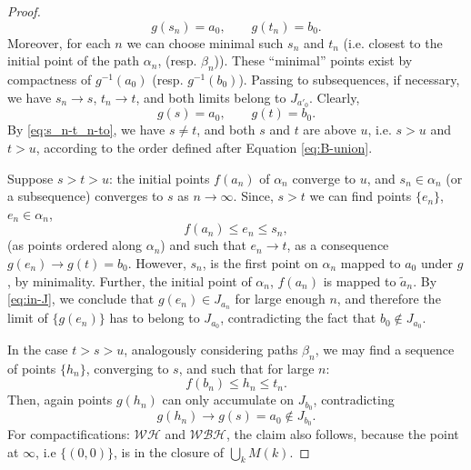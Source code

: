 \documentclass[reqno,12pt]{amsart}
\theoremstyle{ourremark}
\numberwithin{equation}{section}
\numberwithin{theorem}{section}
\begin{document}
\begin{proof}
\begin{equation}\label{eq:s_n-t_n-to}
g(s_n)=a_0,\qquad g(t_n)=b_0.
\end{equation}
Moreover, for each $n$ we can choose minimal such $s_n$ and $t_n$ (i.e. closest to the initial point of the path $\alpha_n$, (resp. $\beta_n$)). 
These ``minimal'' points exist by compactness of $g^{-1}(a_0)$ (resp. $g^{-1}(b_0)$). 
Passing to subsequences, if necessary, we have $s_n\to s$, $t_n\to t$, and both limits belong to $J_{a'_0}$. Clearly,
\begin{equation}\label{eq:g(s)-g(t)}
g(s)=a_0,\qquad g(t)=b_0.
\end{equation}
By \eqref{eq:s_n-t_n-to}, we have  $s\neq t$, and both $s$ and $t$ are above $u$, i.e. $s>u$ and $t>u$, according to the order defined after Equation \eqref{eq:B-union}. 

Suppose $s > t > u$: the initial points $f(a_n)$ of $\alpha_n$  converge to $u$, and  $s_n\in \alpha_n$ (or a subsequence) converges to $s$ as $n\to\infty$.
Since, $s> t$ we can find points $\{e_n\}$, $e_n\in \alpha_n$,
\[
 f(a_n)\leq e_n\leq s_n,
\]
(as points ordered along $\alpha_n$) and such that $e_n\to t$, as a consequence $g(e_n)\to g(t)=b_0$. However, $s_n$, is the first point on $\alpha_n$ mapped to $a_0$ under $g$, by minimality. Further, the initial point of $\alpha_n$, $f(a_n)$ is mapped to $\tilde{a}_n$. By \eqref{eq:in-J}, we conclude that $g(e_n)\in J_{a_n}$ for large enough $n$, and therefore the limit of $\{g(e_n)\}$ has to belong to $J_{a_0}$, contradicting the fact that $b_0\not\in J_{a_0}$. 

In the case $t> s> u$, analogously considering paths $\beta_n$, we may find a sequence of points $\{h_n\}$, converging to $s$, and such that for large $n$:
\[
 f(b_n)\leq h_n\leq t_n.
\]
Then, again points $g(h_n)$ can only accumulate on $J_{b_0}$, contradicting 
\[
g(h_n)\to g(s)=a_0\not\in  J_{b_0}.
\]
For compactifications: $\mathcal{WH}$ and $\mathcal{WBH}$, the claim also follows, because the point at $\infty$, i.e $\{(0,0)\}$, is in the closure of $\bigcup_k M(k)$.  
\end{proof}
\end{document}
